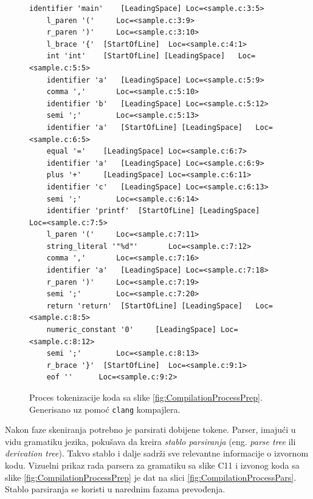 \begin{figure}[h!]
    \begin{lstlisting}[language={}]
    identifier 'main'	 [LeadingSpace]	Loc=<sample.c:3:5>
    l_paren '('		Loc=<sample.c:3:9>
    r_paren ')'		Loc=<sample.c:3:10>
    l_brace '{'	 [StartOfLine]	Loc=<sample.c:4:1>
    int 'int'	 [StartOfLine] [LeadingSpace]	Loc=<sample.c:5:5>
    identifier 'a'	 [LeadingSpace]	Loc=<sample.c:5:9>
    comma ','		Loc=<sample.c:5:10>
    identifier 'b'	 [LeadingSpace]	Loc=<sample.c:5:12>
    semi ';'		Loc=<sample.c:5:13>
    identifier 'a'	 [StartOfLine] [LeadingSpace]	Loc=<sample.c:6:5>
    equal '='	 [LeadingSpace]	Loc=<sample.c:6:7>
    identifier 'a'	 [LeadingSpace]	Loc=<sample.c:6:9>
    plus '+'	 [LeadingSpace]	Loc=<sample.c:6:11>
    identifier 'c'	 [LeadingSpace]	Loc=<sample.c:6:13>
    semi ';'		Loc=<sample.c:6:14>
    identifier 'printf'	 [StartOfLine] [LeadingSpace]	Loc=<sample.c:7:5>
    l_paren '('		Loc=<sample.c:7:11>
    string_literal '"%d"'		Loc=<sample.c:7:12>
    comma ','		Loc=<sample.c:7:16>
    identifier 'a'	 [LeadingSpace]	Loc=<sample.c:7:18>
    r_paren ')'		Loc=<sample.c:7:19>
    semi ';'		Loc=<sample.c:7:20>
    return 'return'	 [StartOfLine] [LeadingSpace]	Loc=<sample.c:8:5>
    numeric_constant '0'	 [LeadingSpace]	Loc=<sample.c:8:12>
    semi ';'		Loc=<sample.c:8:13>
    r_brace '}'	 [StartOfLine]	Loc=<sample.c:9:1>
    eof ''		Loc=<sample.c:9:2>
    \end{lstlisting}
    \caption{Proces tokenizacije koda sa slike \ref{fig:CompilationProcessPrep}. Generisano uz pomoć \texttt{clang} \cite{Clang} kompajlera.}
    \label{fig:CompilationProcessLex}
\end{figure}

Nakon faze skeniranja potrebno je parsirati dobijene tokene. Parser, imajući u vidu gramatiku jezika, pokušava da kreira \emph{stablo parsiranja} (eng. \emph{parse tree} ili \emph{derivation tree}). Takvo stablo i dalje sadrži sve relevantne informacije o izvornom kodu. Vizuelni prikaz rada parsera za gramatiku sa slike C11 i izvonog koda sa slike \ref{fig:CompilationProcessPrep} je dat na slici \ref{fig:CompilationProcessPars}. Stablo parsiranja se koristi u narednim fazama prevođenja.

